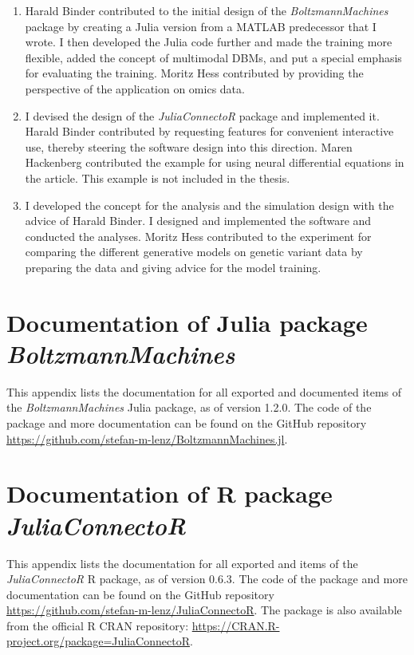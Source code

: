 \documentclass[12pt]{article}
\newcommand{\apkg}[1]{\emph{#1}}
\begin{document}
\begin{appendices}
\begin{enumerate}[(1)]
\item
Harald Binder contributed to the initial design of the \apkg{BoltzmannMachines} package by creating a Julia version from a MATLAB predecessor that I wrote.
I then developed the Julia code further and made the training more flexible, added the concept of multimodal DBMs, and put a special emphasis for evaluating the training.
Moritz Hess contributed by providing the perspective of the application on omics data.

\item
I devised the design of the \apkg{JuliaConnectoR} package and implemented it.
Harald Binder contributed by requesting features for convenient interactive use, thereby steering the software design into this direction.
Maren Hackenberg contributed the example for using neural differential equations in the article. 
This example is not included in the thesis.

\item
I developed the concept for the analysis and the simulation design with the advice of Harald Binder. I designed and implemented the software and conducted the analyses. Moritz Hess contributed to  the experiment for comparing the different generative models on genetic variant data by preparing the data and giving advice for the model training.
\end{enumerate}




\setlength{\emergencystretch}{3em}

\clearpage
\section[Documentation of Julia package \apkg{BoltzmannMachines}]{Documentation of Julia package \\ \apkg{BoltzmannMachines}}
\label{BMDoku}

This appendix lists the documentation for all exported and documented items of the \apkg{BoltzmannMachines} Julia package, as of version 1.2.0. The code of the package and more documentation can be found on the GitHub repository \url{https://github.com/stefan-m-lenz/BoltzmannMachines.jl}.



\clearpage
\section[Documentation of R package \apkg{JuliaConnectoR}]{Documentation of R package \\ \apkg{JuliaConnectoR}}
\label{JuliaConnectoRDoku}
This appendix lists the documentation for all exported and items of the \apkg{JuliaConnectoR} R package, as of version 0.6.3. The code of the package and more documentation can be found on the GitHub repository \url{https://github.com/stefan-m-lenz/JuliaConnectoR}. The package is also available from the official R CRAN repository: \url{https://CRAN.R-project.org/package=JuliaConnectoR}.


\end{appendices}
\end{document}
